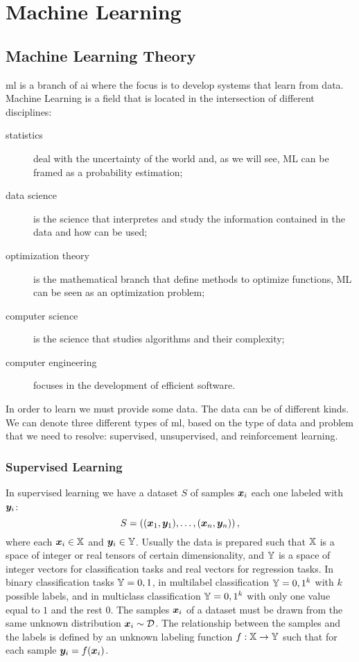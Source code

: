 \chapter{Machine Learning}
\section{Machine Learning Theory}
\ac{ml} is a branch of \ac{ai}
where the focus is to develop systems that learn from data. Machine
Learning is a field that is located in the intersection
of different disciplines:
\begin{description}
\item[statistics] deal with the uncertainty of the world and, as we
  will see, ML can be framed as a probability estimation;
\item[data science] is the science that interpretes and study the
  information contained in the data and how can be used;
\item[optimization theory] is the mathematical branch that define
  methods to optimize functions, ML can be seen as an optimization
  problem;
\item[computer science] is the science that studies algorithms and
  their complexity;
\item[computer engineering] focuses in the development of efficient
  software.
\end{description}

In order to learn we must provide some data. The data can be of
different kinds. We can denote three different types of \ac{ml}, based
on the type of data and problem that we need to resolve: supervised,
unsupervised, and reinforcement learning.

\subsection{Supervised Learning}\label{sec:supervisedTheory}
In supervised learning we have a dataset $S$ of samples $\bm{x}_i$
each one labeled with $\bm{y}_i$:
\begin{equation*}
  S=\left((\bm{x}_1,\bm{y}_1),\dots,(\bm{x}_n,\bm{y}_n)\right),
\end{equation*}
where each $\bm{x}_i\in\mathbb{X}$ and $\bm{y}_i\in\mathbb{Y}$. Usually the
data is prepared such that $\mathbb{X}$ is a space of integer or real
tensors of certain dimensionality, and $\mathbb{Y}$ is a space of integer
vectors for classification tasks and real vectors for regression
tasks. In binary classification tasks $\mathbb{Y}={0,1}$, in multilabel
classification $\mathbb{Y}={0,1}^k$ with $k$ possible labels, and in
multiclass classification $\mathbb{Y}={0,1}^k$ with only one value equal to
$1$ and the rest $0$. The samples $\bm{x}_i$ of a dataset must be
drawn from the same unknown distribution $\bm{x}_i\sim\mathcal{D}$. The
relationship between the samples and the labels is defined by an unknown
labeling function $f:\mathbb{X}\rightarrow\mathbb{Y}$ such that for each sample
$\bm{y}_i=f(\bm{x}_i)$.

